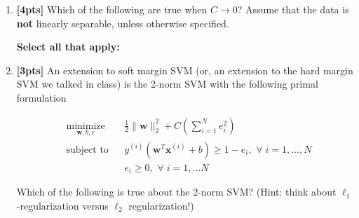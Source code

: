 \begin{enumerate}
    
    \clearpage
    
    \item \textbf{[4pts]} Which of the following are true when $C \rightarrow 0$? Assume that the data is \textbf{not} linearly separable, unless otherwise specified.
    
    \textbf{Select all that apply:}
    
    
    
    \item \textbf{[3pts]} An extension to soft margin SVM (or, an extension to the hard margin SVM we talked in class) is the 2-norm SVM with the following primal formulation
    
    \begin{equation*}
        \begin{aligned}
        & \underset{\mathbf{w}, b, e}{\text{minimize}}
        & & \frac{1}{2}\|\mathbf{w}\|_2^2 + C\left(\sum_{i = 1}^N e_i^2\right)\\
        & \text{subject to}
        & & y^{(i)}(\mathbf{w}^T\mathbf{x}^{(i)} + b) \geq 1 - e_i, \, \, \forall \; i = 1, \dots, N\\
        & & & e_i \geq 0, \, \, \forall \; i = 1, \dots N
        \end{aligned}
    \end{equation*}
    
    Which of the following is true about the 2-norm SVM? (Hint: think about $\ell_1$-regularization versus $\ell_2$ regularization!)
    

\end{enumerate}
